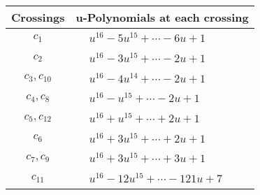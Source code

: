 \documentclass[1p]{elsarticle_modified}
\theoremstyle{definition}
\begin{document}
\begin{tabular}{m{50pt}|m{274pt}}
Crossings & \hspace{64pt}u-Polynomials at each crossing \\
\hline $$\begin{aligned}c_{1}\end{aligned}$$&$\begin{aligned}
&u^{16}-5 u^{15}+\cdots-6 u+1
\end{aligned}$\\
\hline $$\begin{aligned}c_{2}\end{aligned}$$&$\begin{aligned}
&u^{16}-3 u^{15}+\cdots-2 u+1
\end{aligned}$\\
\hline $$\begin{aligned}c_{3},c_{10}\end{aligned}$$&$\begin{aligned}
&u^{16}-4 u^{14}+\cdots-2 u+1
\end{aligned}$\\
\hline $$\begin{aligned}c_{4},c_{8}\end{aligned}$$&$\begin{aligned}
&u^{16}- u^{15}+\cdots-2 u+1
\end{aligned}$\\
\hline $$\begin{aligned}c_{5},c_{12}\end{aligned}$$&$\begin{aligned}
&u^{16}+u^{15}+\cdots+2 u+1
\end{aligned}$\\
\hline $$\begin{aligned}c_{6}\end{aligned}$$&$\begin{aligned}
&u^{16}+3 u^{15}+\cdots+2 u+1
\end{aligned}$\\
\hline $$\begin{aligned}c_{7},c_{9}\end{aligned}$$&$\begin{aligned}
&u^{16}+3 u^{15}+\cdots+3 u+1
\end{aligned}$\\
\hline $$\begin{aligned}c_{11}\end{aligned}$$&$\begin{aligned}
&u^{16}-12 u^{15}+\cdots-121 u+7
\end{aligned}$\\
\hline
\end{tabular}\\~\\
\end{document}
